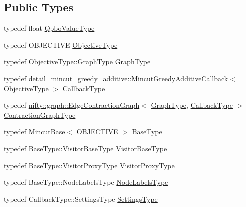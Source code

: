 \subsection*{Public Types}
\begin{DoxyCompactItemize}
\item 
typedef float \hyperlink{classnifty_1_1graph_1_1opt_1_1mincut_1_1MincutGreedyAdditive_aaaf060bf6308159bbe5cc3fecb7ccfca}{Qpbo\+Value\+Type}
\item 
typedef O\+B\+J\+E\+C\+T\+I\+VE \hyperlink{classnifty_1_1graph_1_1opt_1_1mincut_1_1MincutGreedyAdditive_a1e4f0fc6675ac7d977619126bfd6e143}{Objective\+Type}
\item 
typedef Objective\+Type\+::\+Graph\+Type \hyperlink{classnifty_1_1graph_1_1opt_1_1mincut_1_1MincutGreedyAdditive_a3bd8a5b329b83aead0cab24bd24fa884}{Graph\+Type}
\item 
typedef detail\+\_\+mincut\+\_\+greedy\+\_\+additive\+::\+Mincut\+Greedy\+Additive\+Callback$<$ \hyperlink{classnifty_1_1graph_1_1opt_1_1mincut_1_1MincutGreedyAdditive_a1e4f0fc6675ac7d977619126bfd6e143}{Objective\+Type} $>$ \hyperlink{classnifty_1_1graph_1_1opt_1_1mincut_1_1MincutGreedyAdditive_acfb227c3e34c4295ae909fcf0ecbccf1}{Callback\+Type}
\item 
typedef \hyperlink{classnifty_1_1graph_1_1EdgeContractionGraph}{nifty\+::graph\+::\+Edge\+Contraction\+Graph}$<$ \hyperlink{classnifty_1_1graph_1_1opt_1_1mincut_1_1MincutGreedyAdditive_a3bd8a5b329b83aead0cab24bd24fa884}{Graph\+Type}, \hyperlink{classnifty_1_1graph_1_1opt_1_1mincut_1_1MincutGreedyAdditive_acfb227c3e34c4295ae909fcf0ecbccf1}{Callback\+Type} $>$ \hyperlink{classnifty_1_1graph_1_1opt_1_1mincut_1_1MincutGreedyAdditive_a86d8ece1058b68985541278c646b0876}{Contraction\+Graph\+Type}
\item 
typedef \hyperlink{classnifty_1_1graph_1_1opt_1_1mincut_1_1MincutBase}{Mincut\+Base}$<$ O\+B\+J\+E\+C\+T\+I\+VE $>$ \hyperlink{classnifty_1_1graph_1_1opt_1_1mincut_1_1MincutGreedyAdditive_a2f1009590b7ee06e4b15ed0b94c658a0}{Base\+Type}
\item 
typedef Base\+Type\+::\+Visitor\+Base\+Type \hyperlink{classnifty_1_1graph_1_1opt_1_1mincut_1_1MincutGreedyAdditive_a6754295908ae1d3f3ce8a98999bff99d}{Visitor\+Base\+Type}
\item 
typedef \hyperlink{classnifty_1_1graph_1_1opt_1_1common_1_1SolverBase_ad209b469b3bc9fc0fc14e9fed4d09075}{Base\+Type\+::\+Visitor\+Proxy\+Type} \hyperlink{classnifty_1_1graph_1_1opt_1_1mincut_1_1MincutGreedyAdditive_a3891af76873b45807f761c64701aeab9}{Visitor\+Proxy\+Type}
\item 
typedef Base\+Type\+::\+Node\+Labels\+Type \hyperlink{classnifty_1_1graph_1_1opt_1_1mincut_1_1MincutGreedyAdditive_a5a8855589a1e752e63650d8e678fc162}{Node\+Labels\+Type}
\item 
typedef Callback\+Type\+::\+Settings\+Type \hyperlink{classnifty_1_1graph_1_1opt_1_1mincut_1_1MincutGreedyAdditive_acc6768ee2aa88a457488451751bd4aac}{Settings\+Type}
\end{DoxyCompactItemize}
